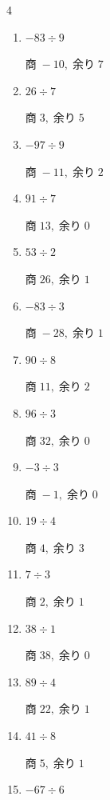 \begin{multicols}{4}
\begin{enumerate}
        $商\; 3,\; 余り\; 3$

  \item $-83 \div 9$

        $商\; -10,\; 余り\; 7$

  \item $26 \div 7$

        $商\; 3,\; 余り\; 5$

  \item $-97 \div 9$

        $商\; -11,\; 余り\; 2$

  \item $91 \div 7$

        $商\; 13,\; 余り\; 0$

  \item $53 \div 2$

        $商\; 26,\; 余り\; 1$

  \item $-83 \div 3$

        $商\; -28,\; 余り\; 1$

  \item $90 \div 8$

        $商\; 11,\; 余り\; 2$

  \item $96 \div 3$

        $商\; 32,\; 余り\; 0$

  \item $-3 \div 3$

        $商\; -1,\; 余り\; 0$

  \item $19 \div 4$

        $商\; 4,\; 余り\; 3$

  \item $7 \div 3$

        $商\; 2,\; 余り\; 1$

  \item $38 \div 1$

        $商\; 38,\; 余り\; 0$

  \item $89 \div 4$

        $商\; 22,\; 余り\; 1$

\columnbreak %

  \item $41 \div 8$

        $商\; 5,\; 余り\; 1$

  \item $-67 \div 6$


\end{enumerate}
\end{multicols}
